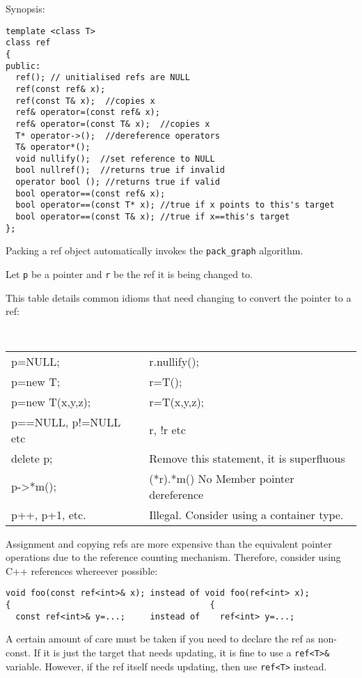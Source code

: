 Synopsis:
\begin{verbatim}
template <class T>
class ref
{
public:
  ref(); // unitialised refs are NULL
  ref(const ref& x);
  ref(const T& x);  //copies x
  ref& operator=(const ref& x);
  ref& operator=(const T& x);  //copies x
  T* operator->();  //dereference operators
  T& operator*(); 
  void nullify();  //set reference to NULL
  bool nullref();  //returns true if invalid
  operator bool (); //returns true if valid
  bool operator==(const ref& x);
  bool operator==(const T* x); //true if x points to this's target
  bool operator==(const T& x); //true if x==this's target
};
\end{verbatim}

Packing a ref object automatically invokes the \verb+pack_graph+ algorithm.


Let {\tt p} be a pointer and {\tt r} be the ref it is being changed
to.

This table details common idioms that need changing to convert the
pointer to a ref:

\vspace{1ex}
{\tt
\begin{tabular}{ll}
\hline
p=NULL; & r.nullify();\\
p=new T; & r=T();\\
p=new T(x,y,z); & r=T(x,y,z);\\
p==NULL, p!=NULL etc & r, !r etc\\
delete p; & Remove this statement, it is superfluous\\ 
p->*m(); & (*r).*m() No Member pointer dereference\\
p++, p+1, etc. & Illegal. Consider using a container type.\\
\hline
\end{tabular}
}
\vspace{1ex}

Assignment and copying refs are more expensive than the equivalent
pointer operations due to the reference counting mechanism. Therefore,
consider using C++ references whereever possible:

\begin{verbatim}
void foo(const ref<int>& x); instead of void foo(ref<int> x);
{                                        {
  const ref<int>& y=...;     instead of    ref<int> y=...;
\end{verbatim}

A certain amount of care must be taken if you need to declare the
ref as non-const. If it is just the target that needs updating,
it is fine to use a \verb+ref<T>&+ variable. However, if the ref
itself needs updating, then use \verb+ref<T>+ instead.

